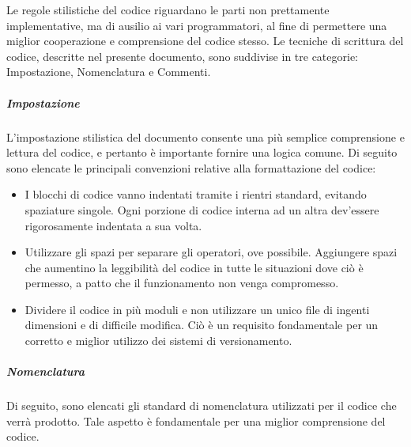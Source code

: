 Le regole stilistiche del codice riguardano le parti non prettamente implementative, ma di ausilio ai vari programmatori, al fine di permettere una miglior cooperazione e comprensione del codice stesso. Le tecniche di scrittura del codice, descritte nel presente documento, sono suddivise in tre categorie: Impostazione, Nomenclatura e Commenti.

\subparagraph{Impostazione}
L'impostazione stilistica del documento consente una più semplice comprensione e lettura del codice, e pertanto è importante fornire una logica comune. Di seguito sono elencate le principali convenzioni relative alla formattazione del codice: 

\begin{itemize}
	\item
	I blocchi di codice vanno indentati tramite i rientri standard, evitando spaziature singole. Ogni porzione di codice interna ad un altra dev'essere rigorosamente indentata a sua volta.
	\item
	Utilizzare gli spazi per separare gli operatori, ove possibile. Aggiungere spazi che aumentino la leggibilità del codice in tutte le situazioni dove ciò è permesso, a patto che il funzionamento non venga compromesso.
	\item
	Dividere il codice in più moduli e non utilizzare un unico file di ingenti dimensioni e di difficile modifica. Ciò è un requisito fondamentale per un corretto e miglior utilizzo dei sistemi di versionamento.
\end{itemize}

\subparagraph{Nomenclatura}

Di seguito, sono elencati gli standard di nomenclatura utilizzati per il codice che verrà prodotto. Tale aspetto è fondamentale per una miglior comprensione del codice.

